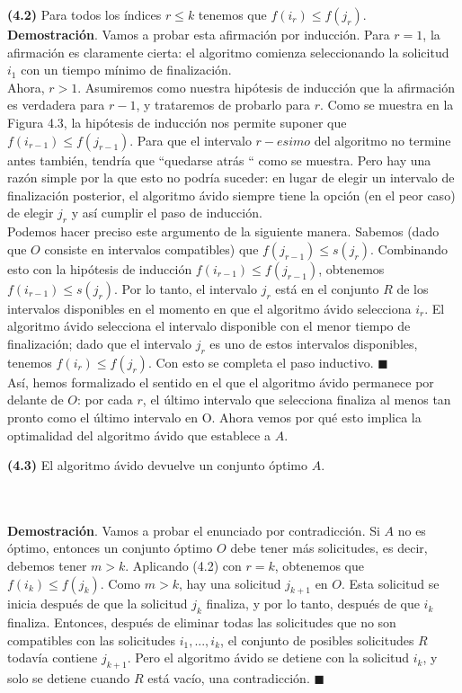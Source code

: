 \documentclass[a4paper, 12pt]{book}
\theoremstyle{dotless}
\begin{document}
\textbf{(4.2)} Para todos los índices $r ≤ k$ tenemos que $f (i_r) ≤ f (j_r)$.\\


\textbf{Demostración}. Vamos a probar esta afirmación por inducción. Para $r=1$, la afirmación es claramente cierta: el algoritmo comienza seleccionando la solicitud $i_1$ con un tiempo mínimo de finalización.\\

Ahora, $r>1$. Asumiremos como nuestra hipótesis de inducción que la afirmación es verdadera para $r-1$, y trataremos de probarlo para $r$. Como se muestra en la Figura 4.3, la hipótesis de inducción nos permite suponer que $f(i_{r-1}) ≤ f(j_{r-1})$. Para que el intervalo $r-esimo$ del algoritmo no termine antes también, tendría que ``quedarse atrás `` como se muestra. Pero hay una razón simple por la que esto no podría suceder: en lugar de elegir un intervalo de finalización posterior, el algoritmo ávido siempre tiene la opción (en el peor caso) de elegir $j_r$ y así cumplir el paso de inducción.\\

Podemos hacer preciso este argumento de la siguiente manera. Sabemos (dado que $O$ consiste en intervalos compatibles) que $f(j_{r-1}) ≤ s(j_r)$. Combinando esto con la hipótesis de inducción $f(i_{r-1}) ≤ f(j_{r-1})$, obtenemos $f(i_{r-1}) ≤ s(j_r)$. Por lo tanto, el intervalo $j_r$ está en el conjunto $R$ de los intervalos disponibles en el momento en que el algoritmo ávido selecciona $i_r$. El algoritmo ávido selecciona el intervalo disponible con el menor tiempo de finalización; dado que el intervalo $j_r$ es uno de estos intervalos disponibles, tenemos $f(i_r) ≤ f(j_r)$. Con esto se completa el paso inductivo.  $\blacksquare$\\

Así, hemos formalizado el sentido en el que el algoritmo ávido permanece por delante de $O$: por cada $r$, el último intervalo que selecciona finaliza al menos tan pronto como el último intervalo en O. Ahora vemos por qué esto implica la optimalidad del algoritmo ávido que establece a $A$.\\

\colorbox{mygray}{\parbox{15cm}{
	\textbf{(4.3)}  El algoritmo ávido devuelve un conjunto óptimo $A$.}}\\\\


\textbf{Demostración}. Vamos a probar el enunciado por contradicción. Si $A$ no es óptimo, entonces un conjunto óptimo $O$ debe tener más solicitudes, es decir, debemos tener $m>k$. Aplicando (4.2) con $r = k$, obtenemos que $f(i_k) ≤ f(j_k)$. Como $m>k$, hay una solicitud $j_{k + 1}$ en $O$. Esta solicitud se inicia después de que la solicitud $j_k$ finaliza, y por lo tanto, después de que $i_k$ finaliza. Entonces, después de eliminar todas las solicitudes que no son compatibles con las solicitudes $i_1, ..., i_k$, el conjunto de posibles solicitudes $R$ todavía contiene $j_{k + 1}$. Pero el algoritmo ávido se detiene con la solicitud $i_k$, y solo se detiene cuando $R$ está vacío, una contradicción.  $\blacksquare$\\
\end{document}
